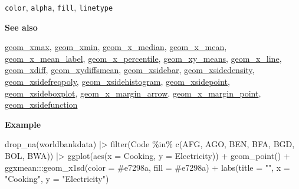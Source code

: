 \documentclass[
  letterpaper,
  DIV=11,
  numbers=noendperiod]{scrreprt}
\newenvironment{Shaded}{\begin{snugshade}}{\end{snugshade}}
\newcommand{\AttributeTok}[1]{\textcolor[rgb]{0.40,0.45,0.13}{#1}}
\newcommand{\FunctionTok}[1]{\textcolor[rgb]{0.28,0.35,0.67}{#1}}
\newcommand{\NormalTok}[1]{\textcolor[rgb]{0.00,0.23,0.31}{#1}}
\newcommand{\SpecialCharTok}[1]{\textcolor[rgb]{0.37,0.37,0.37}{#1}}
\newcommand{\StringTok}[1]{\textcolor[rgb]{0.13,0.47,0.30}{#1}}
\begin{document}
\texttt{color}, \texttt{alpha}, \texttt{fill}, \texttt{linetype}

\textbf{See also}

\href{@xmax}{geom\_xmax}, \href{@xmin}{geom\_xmin},
\href{@x_median}{geom\_x\_median}, \href{@x_mean}{geom\_x\_mean},
\href{@x_mean_label}{geom\_x\_mean\_label},
\href{@x_percentile}{geom\_x\_percentile},
\href{@xy_means}{geom\_xy\_means}, \href{@x_line}{geom\_x\_line},
\href{@xdiff}{geom\_xdiff}, \href{@xydiffsmean}{geom\_xydiffsmean},
\href{@xsidebar}{geom\_xsidebar},
\href{@xsidedensity}{geom\_xsidedensity},
\href{@xsidefreqpoly}{geom\_xsidefreqpoly},
\href{@xsidehistogram}{geom\_xsidehistogram},
\href{@xsidepoint}{geom\_xsidepoint},
\href{@xsideboxplot}{geom\_xsideboxplot},
\href{@x_margin_arrow}{geom\_x\_margin\_arrow},
\href{@x_margin_point}{geom\_x\_margin\_point},
\href{@xsidefunction}{geom\_xsidefunction}

\textbf{Example }

\begin{Shaded}
\begin{Highlighting}[]
\FunctionTok{drop\_na}\NormalTok{(worldbankdata) }\SpecialCharTok{|\textgreater{}} 
  \FunctionTok{filter}\NormalTok{(Code }\SpecialCharTok{\%in\%} \FunctionTok{c}\NormalTok{(}\StringTok{\textquotesingle{}AFG\textquotesingle{}}\NormalTok{, }\StringTok{\textquotesingle{}AGO\textquotesingle{}}\NormalTok{, }\StringTok{\textquotesingle{}BEN\textquotesingle{}}\NormalTok{, }\StringTok{\textquotesingle{}BFA\textquotesingle{}}\NormalTok{, }\StringTok{\textquotesingle{}BGD\textquotesingle{}}\NormalTok{, }\StringTok{\textquotesingle{}BOL\textquotesingle{}}\NormalTok{, }\StringTok{\textquotesingle{}BWA\textquotesingle{}}\NormalTok{)) }\SpecialCharTok{|\textgreater{}}
  \FunctionTok{ggplot}\NormalTok{(}\FunctionTok{aes}\NormalTok{(}\AttributeTok{x =}\NormalTok{ Cooking, }\AttributeTok{y =}\NormalTok{ Electricity)) }\SpecialCharTok{+} 
  \FunctionTok{geom\_point}\NormalTok{() }\SpecialCharTok{+} 
\NormalTok{  ggxmean}\SpecialCharTok{:::}\FunctionTok{geom\_x1sd}\NormalTok{(}\AttributeTok{color =} \StringTok{\textquotesingle{}\#e7298a\textquotesingle{}}\NormalTok{, }\AttributeTok{fill =} \StringTok{\textquotesingle{}\#e7298a\textquotesingle{}}\NormalTok{) }\SpecialCharTok{+}
  \FunctionTok{labs}\NormalTok{(}\AttributeTok{title =} \StringTok{""}\NormalTok{, }\AttributeTok{x =} \StringTok{"Cooking"}\NormalTok{, }\AttributeTok{y =} \StringTok{"Electricity"}\NormalTok{) }
\end{Highlighting}
\end{Shaded}
\end{document}
